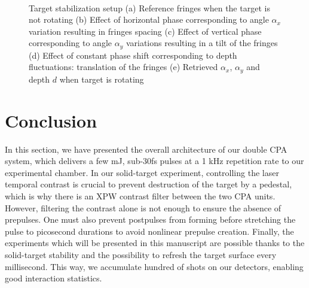 \begin{figure}[H]
\centering
{}\\
\caption{\label{fig:TargetStabilization} Target stabilization setup (a) Reference fringes when the target is not rotating  (b) Effect of horizontal phase corresponding to angle $\alpha_x$ variation resulting in fringes spacing (c) Effect of vertical phase corresponding to angle $\alpha_y$ variations resulting in a tilt of the fringes (d) Effect of constant phase shift corresponding to depth fluctuations: translation of the fringes (e) Retrieved $\alpha_x$, $\alpha_y$ and depth $d$ when target is rotating}
\end{figure}





\section{Conclusion}

In this section, we have presented the overall architecture of our double CPA system, which delivers a few mJ, sub-30fs pulses at a 1 kHz repetition rate to our experimental chamber. In our solid-target experiment, controlling the laser temporal contrast is crucial to prevent destruction of the target by a pedestal, which is why there is an XPW contrast filter between the two CPA units. However, filtering the contrast alone is not enough to ensure the absence of prepulses. One must also prevent postpulses from forming before stretching the pulse to picosecond durations to avoid nonlinear prepulse creation. Finally, the experiments which will be presented in this manuscript are possible thanks to the solid-target stability and the possibility to refresh the target surface every millisecond. This way, we accumulate  hundred of shots on our detectors, enabling good  interaction statistics.






























